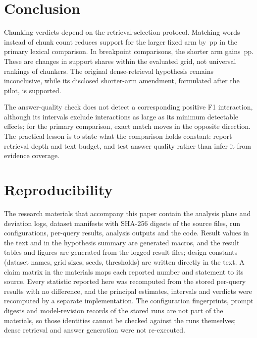 \documentclass[11pt]{article}
\newcommand{\pp}{\ensuremath{\,\mathrm{pp}}}
\DeclareRobustCommand{\artifactref}[1]{}
\DeclareRobustCommand{\artifactref}[1]{ (\path{#1})}
\begin{document}
\section{Conclusion}
Chunking verdicts depend on the retrieval-selection protocol. Matching words instead of chunk count reduces support for the larger fixed arm by \HOneEst\pp{} in the primary lexical comparison. In breakpoint comparisons, the shorter arm gains \HFourEst\pp{}. These are changes in support shares within the evaluated grid, not universal rankings of chunkers. The original dense-retrieval hypothesis remains inconclusive, while its disclosed shorter-arm amendment, formulated after the pilot, is supported.

The answer-quality check does not detect a corresponding positive F1 interaction, although its intervals exclude interactions as large as its minimum detectable effects; for the primary comparison, exact match moves in the opposite direction. The practical lesson is to state what the comparison holds constant: report retrieval depth and text budget, and test answer quality rather than infer it from evidence coverage.

\section{Reproducibility}\label{sec:reproducibility}
The research materials that accompany this paper contain the analysis plans and deviation logs, dataset manifests with SHA-256 digests of the source files, run configurations, per-query results, analysis outputs and the code. Result values in the text and in the hypothesis summary are generated macros\artifactref{manuscript/make_numbers.py}, and the result tables\artifactref{manuscript/make_tables.py} and figures\artifactref{src/ragmv/figures.py} are generated from the logged result files; design constants (dataset names, grid sizes, seeds, thresholds) are written directly in the text. A claim matrix in the materials\artifactref{docs/remediation/CLAIM_MATRIX.md} maps each reported number and statement to its source. Every statistic reported here was recomputed from the stored per-query results with no difference, and the principal estimates, intervals and verdicts were recomputed by a separate implementation. The configuration fingerprints, prompt digests and model-revision records of the stored runs are not part of the materials, so those identities cannot be checked against the runs themselves; dense retrieval and answer generation were not re-executed.
\end{document}

